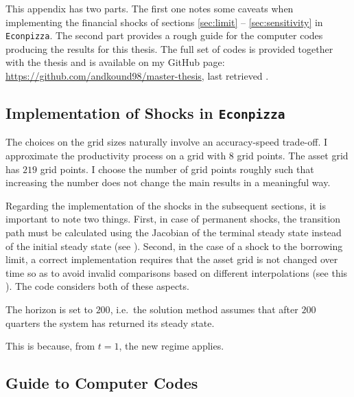 \documentclass[12pt]{article} %
\numberwithin{equation}{section} %
\numberwithin{figure}{section}
\numberwithin{table}{section}
\begin{document}
\begin{refsection}
\begin{appendices}
This appendix has two parts. The first one notes some caveats when implementing the financial shocks of sections \ref{sec:limit} -- \ref{sec:sensitivity} in \texttt{Econpizza}. The second part provides a rough guide for the computer codes producing the results for this thesis. The full set of codes is provided together with the thesis and is available on my GitHub page: \url{https://github.com/andkound98/master-thesis}, last retrieved .

\subsection{Implementation of Shocks in \texttt{Econpizza}}
\label{sec-app:codes-ep}

The choices on the grid sizes naturally involve an accuracy-speed trade-off. I approximate the productivity process on a grid with $8$ grid points. The asset grid has $219$ grid points. I choose the number of grid points roughly such that increasing the number does not change the main results in a meaningful way.

Regarding the implementation of the shocks in the subsequent sections, it is important to note two things. First, in case of permanent shocks, the transition path must be calculated using the Jacobian of the terminal steady state instead of the initial steady state (see \cite{auclert2021}). Second, in the case of a shock to the borrowing limit, a correct implementation requires that the asset grid is not changed over time so as to avoid invalid comparisons based on different interpolations (see this \cite{mellior2016mimeo}). The code considers both of these aspects.

The horizon is set to $200$, i.e.~the solution method assumes that after $200$ quarters the system has returned its steady state.


This is because, from $t=1$, the new regime applies.

\subsection{Guide to Computer Codes}
\label{sec-app:codes-guide}


\end{appendices}
\end{refsection}
\end{document}
